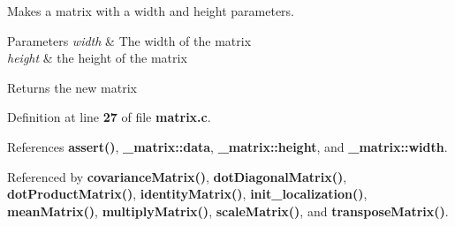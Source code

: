 Makes a matrix with a width and height parameters. 


\begin{DoxyParams}{Parameters}
{\em width} & The width of the matrix \\
\hline
{\em height} & the height of the matrix \\
\hline
\end{DoxyParams}
\begin{DoxyReturn}{Returns}
the new matrix 
\end{DoxyReturn}


Definition at line \textbf{ 27} of file \textbf{ matrix.\+c}.



References \textbf{ assert()}, \textbf{ \+\_\+matrix\+::data}, \textbf{ \+\_\+matrix\+::height}, and \textbf{ \+\_\+matrix\+::width}.



Referenced by \textbf{ covariance\+Matrix()}, \textbf{ dot\+Diagonal\+Matrix()}, \textbf{ dot\+Product\+Matrix()}, \textbf{ identity\+Matrix()}, \textbf{ init\+\_\+localization()}, \textbf{ mean\+Matrix()}, \textbf{ multiply\+Matrix()}, \textbf{ scale\+Matrix()}, and \textbf{ transpose\+Matrix()}.


